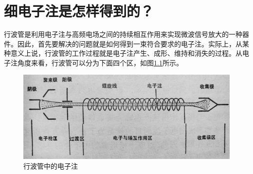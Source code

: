 \chapter{细电子注是怎样得到的？}

行波管是利用电子注与高频电场之间的持续相互作用来实现微波信号放大的一种器件。因此，首先要解决的问题就是如何得到一束符合要求的电子注。实际上，从某种意义上说，行波管的工作过程就是电子注产生、成形、维持和消失的过程。从电子注角度来看，行波管可以分为下面四个区，如图\ref{ch6-1}所示。

\begin{figure}[phtb]
	\centering
	\includegraphics[width=0.65\linewidth]{figure/ch6-1}
	\caption{行波管中的电子注}
	\label{ch6-1}
\end{figure}

